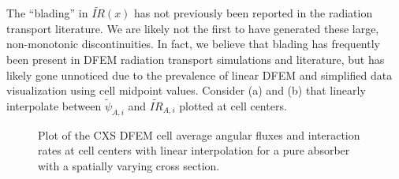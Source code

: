 The ``blading'' in $\widetilde{IR}(x)$ has not previously been reported in the radiation transport literature.
We are likely not the first to have generated these large, non-monotonic discontinuities. 
In fact, we believe that blading has frequently been present in DFEM radiation transport simulations and literature, but has likely gone unnoticed due to the prevalence of linear DFEM and simplified data visualization using cell midpoint values.
Consider (a) and (b) that linearly interpolate between $\widetilde{\psi}_{A,i}$ and  $\widetilde{IR}_{A,i}$ plotted at cell centers.
\begin{figure}[!htp]
\begin{center}
\end{center}
\caption{Plot of the CXS DFEM cell average angular fluxes and interaction rates at cell centers with linear interpolation for a pure absorber with a spatially varying cross section.}
\label{fig:cxs_avg}
\end{figure}
